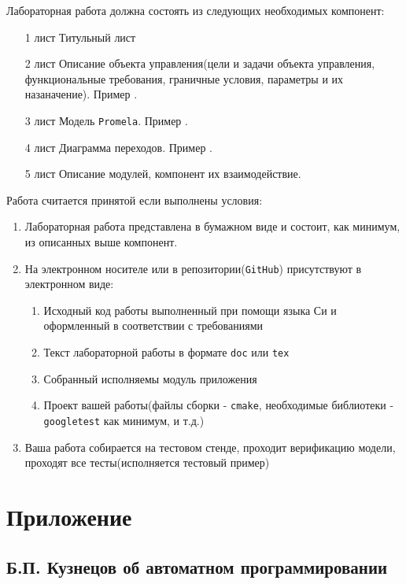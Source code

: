 \documentclass[12pt, twoside]{report}
\begin{document}
Лабораторная работа должна состоять из следующих необходимых компонент:
\begin{itemize}
  \item[ 1 лист ] Титульный лист
  \item[ 2 лист ] Описание объекта управления(цели и задачи объекта управления, функциональные требования, граничные условия, параметры и их назаначение). Пример .
  \item[ 3 лист ] Модель \texttt{Promela}. Пример .
  \item[ 4 лист ] Диаграмма переходов. Пример .
  \item[ 5 лист ] Описание модулей, компонент их взаимодействие.
\end{itemize}

Работа считается принятой если выполнены условия:
\begin{enumerate}
  \item Лабораторная работа представлена в бумажном виде и состоит, как минимум, из описанных выше компонент.
  \item На электронном носителе или в репозитории(\texttt{GitHub}) присутствуют в электронном виде:
    \begin{enumerate}
      \item Исходный код работы выполненный при помощи языка Си и оформленный в соответствии с требованиями 
      \item Текст лабораторной работы в формате \texttt{doc} или \texttt{tex}
      \item Собранный исполняемы модуль приложения
      \item Проект вашей работы(файлы сборки - \texttt{cmake}, необходимые библиотеки - \texttt{googletest} как минимум, и т.д.)
    \end{enumerate}
  \item Ваша работа собирается на тестовом стенде, проходит верификацию модели, проходят все тесты(исполняется тестовый пример)
\end{enumerate}


\newpage
\chapter*{Приложение}\label{addons}

\section*{Б.П. Кузнецов об автоматном программировании}\label{kuznetcov_about}
\end{document}

